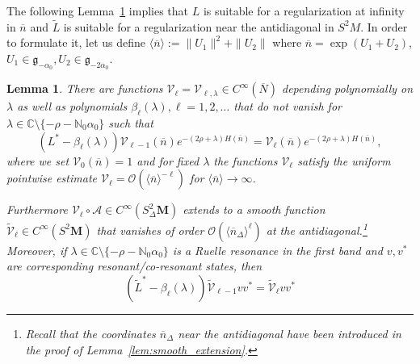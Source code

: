 \documentclass[10pt]{amsart}
\newtheorem{lemm}[cdrthm]{Lemma}
\theoremstyle{definition}
\newcommand{\mc}{\mathcal}
\newcommand{\cc}{\mathbb{C}}
\newcommand{\til}{\widetilde}
\newcommand{\N}{\mathbb{N}}
\newcommand{\g}{\mathfrak g}
\newcommand{\bn}{{\overline{n}}}
\newcommand{\bN}{{\overline{N}}}
\begin{document}
The following Lemma~\ref{lem:L-regularizing} implies that $L$ is suitable for a regularization at infinity in $\bn$ and $\til L$ is suitable for a regularization near the antidiagonal in $S^2M$. In order to formulate it, let us define $\langle \bn\rangle:= \|U_1\|^2+\|U_2\|$ where $ \bn=\exp(U_1+U_2)$,\linebreak$U_1\in\g_{-\alpha_0}, U_2\in\g_{-2\alpha_0}$.

\begin{lemm}\label{lem:L-regularizing}
There are functions $\mathcal V_{\ell}=\mathcal V_{\ell,\lambda} \in C^\infty(\bN)$ depending polynomially on $\lambda$ as well as polynomials $\beta_\ell(\lambda), \ell=1,2,\ldots$ that do not vanish for $\lambda\in\cc\setminus\{-\rho - \N_0\alpha_0\}$ such that
\begin{equation}\label{eq:L-regularizing}
(L^*-\beta_\ell(\lambda)) \mathcal V_{\ell-1}(\bn)e^{-(2\rho+\lambda)H(\bn)} =
\mathcal V_\ell(\bn)e^{-(2\rho+\lambda)H(\bn)},
\end{equation}
where we set $\mathcal V_0(\bn)=1$ and for fixed $\lambda$ the functions $\mathcal V_\ell$ satisfy the uniform pointwise estimate $\mc{V}_\ell= \mc O(\langle \bn\rangle^{-\ell})$ for $\langle \bn\rangle \to\infty$.

Furthermore $\mathcal V_\ell \circ \mathcal A\in C^\infty(S^2_\Delta \mathbf M)$ extends to a smooth function $\til{\mathcal V}_\ell \in C^\infty(S^2\mathbf M)$ that vanishes of order $\mc{O}(\langle\bn_\Delta\rangle^\ell)$ at the antidiagonal.\footnote{Recall that the coordinates $\bn_\Delta$ near the antidiagonal have been introduced in the proof of Lemma~\ref{lem:smooth_extension}.} Moreover, if $\lambda\in\cc\setminus\{-\rho - \N_0\alpha_0\}$ is a Ruelle resonance in the first band and $v,v^*$ are corresponding resonant/co-resonant states, then
\begin{equation}\label{eq:Ltilde-regularizing}
\left(\til L^* - \beta_\ell(\lambda)\right)\til{\mathcal V}_{\ell-1}vv^* =
\til{\mathcal V}_\ell vv^*
\end{equation}
\end{lemm}
\end{document}
